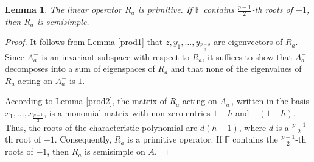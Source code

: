 \documentclass[12pt]{article}
\newcommand\F{\mathbb{F}}
\newcommand\al{\alpha}
\newcommand\bt{\beta}
\newcommand\gam{\gamma}
\newcommand\lm{\lambda}
\newtheorem{lem}{Lemma}
\begin{document}
\begin{lem}\label{ra2}
    The linear operator $R_a$ is primitive. If $\F$ contains $\frac{p-1}{2}$-th roots of $-1$, then $R_a$ is semisimple.
\end{lem}
\begin{proof}
It follows from Lemma \ref{prod1} that $z, y_1, \dots, y_{\frac{p-3}{2}}$ are eigenvectors of $R_a$. Since $A_a^-$ is an invariant subspace with respect to $R_a$, it suffices to show that $A_a^-$ decomposes into a sum of eigenspaces of $R_a$ and that none of the eigenvalues of $R_a$ acting on $A_a^-$ is $1$. 

According to Lemma \ref{prod2}, the matrix of $R_a$ acting on $A_a^-$, written in the basis $x_1, \dots, x_{\frac{p-1}{2}}$, is a monomial matrix with non-zero entries $1-h$ and $-(1-h)$. Thus, the roots of the characteristic polynomial are $d(h-1)$, where $d$ is a $\frac{p-1}{2}$-th root of $-1$. Consequently, $R_a$ is a primitive operator. If $\F$ contains the $\frac{p-1}{2}$-th roots of $-1$, then $R_a$ is semisimple on $A$.
    
    
\end{proof}


\end{document}
